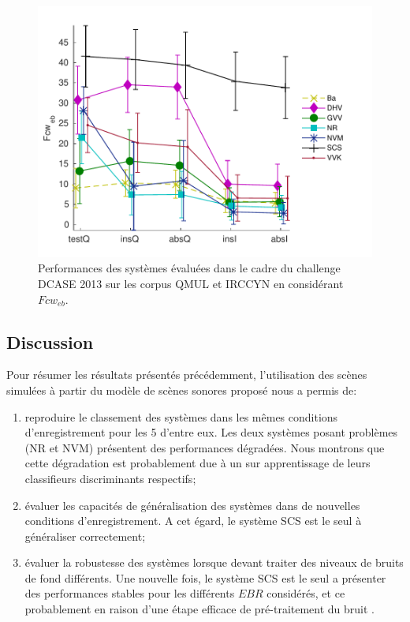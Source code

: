 \begin{figure}[t]
\includegraphics[width=1\textwidth]{gfx/ch_7/irccyn}
\caption{Performances des systèmes évaluées dans le cadre du challenge DCASE 2013 sur les corpus QMUL et IRCCYN en considérant $Fcw_{eb}$.}
\label{fig:irccyn}
\end{figure}

\subsection{Discussion}


Pour résumer les résultats présentés précédemment, l'utilisation des scènes simulées à partir du modèle de scènes sonores proposé nous a permis de:

\begin{enumerate}
\item reproduire le classement des systèmes dans les mêmes conditions d'enregistrement pour les 5 d'entre eux. Les deux systèmes posant problèmes (NR et NVM) présentent des performances dégradées. Nous montrons que cette dégradation est probablement due à un sur apprentissage de leurs  classifieurs discriminants respectifs;
\item évaluer les capacités de généralisation des systèmes dans de nouvelles conditions d'enregistrement. A cet égard, le système SCS est le seul à généraliser correctement;
\item évaluer la robustesse des systèmes lorsque devant traiter des niveaux de bruits de fond différents. Une nouvelle fois, le système SCS est le seul a présenter des performances stables pour les différents $EBR$ considérés, et ce probablement en raison d'une étape efficace de pré-traitement du bruit .
\end{enumerate}

